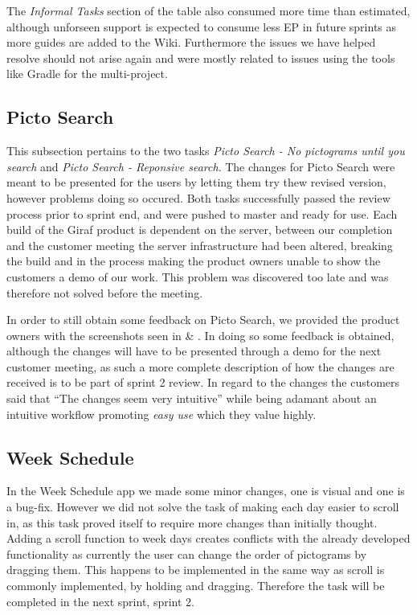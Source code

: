 The \textit{Informal Tasks} section of the table also consumed more time than estimated, although unforseen support is expected to consume less EP in future sprints as more guides are added to the Wiki.
Furthermore the issues we have helped resolve should not arise again and were mostly related to issues using the tools like Gradle for the multi-project.

\subsection{Picto Search}
This subsection pertains to the two tasks \textit{Picto Search - No pictograms until you search} and \textit{Picto Search - Reponsive search}.
The changes for Picto Search were meant to be presented for the users by letting them try thew revised version, however problems doing so occured.
Both tasks successfully passed the review process prior to sprint end, and were pushed to master and ready for use.
Each build of the Giraf product is dependent on the server, between our completion and the customer meeting the server infrastructure had been altered, breaking the build and in the process making the product owners unable to show the customers a demo of our work.
This problem was discovered too late and was therefore not solved before the meeting.

In order to still obtain some feedback on Picto Search, we provided the product owners with the screenshots seen in  \& .
In doing so some feedback is obtained, although the changes will have to be presented through a demo for the next customer meeting, as such a more complete description of how the changes are received is to be part of sprint 2 review.   
In regard to the changes the customers said that \enquote{The changes seem very intuitive} while being adamant about an intuitive workflow promoting \textit{easy use} which they value highly.

\subsection{Week Schedule}
In the Week Schedule app we made some minor changes, one is visual and one is a bug-fix. 
However we did not solve the task of making each day easier to scroll in, as this task proved itself to require more changes than initially thought.
Adding a scroll function to week days creates conflicts with the already developed functionality as currently the user can change the order of pictograms by dragging them.
This happens to be implemented in the same way as scroll is commonly implemented, by holding and dragging.
Therefore the task will be completed in the next sprint, sprint 2.